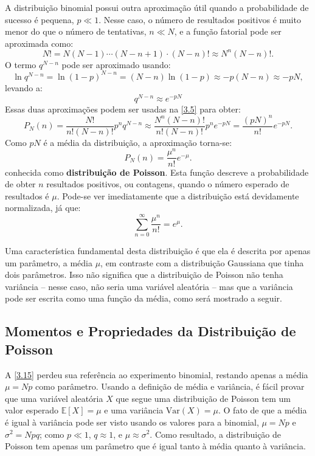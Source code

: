 A distribuição binomial possui outra aproximação útil quando a probabilidade de sucesso é pequena, $p \ll 1$. Nesse caso, o número de resultados positivos é muito menor do que o número de tentativas, $n \ll N$, e a função fatorial pode ser aproximada como:
\begin{equation*}
N! = N (N - 1) \cdots (N - n + 1) \cdot (N - n)! \approx N^n(N - n)!. 
\end{equation*}
O termo $q^{N - n}$ pode ser aproximado usando:
\begin{equation*}
\ln q^{N - n} = \ln(1 - p)^{N - n} = (N - n) \ln(1 - p) \approx - p(N - n) \approx - pN, 
\end{equation*}
levando a:
\begin{equation*}
q^{N - n} \approx e^{- pN}
\end{equation*}
Essas duas aproximações podem ser usadas na \autoref{3.5} para obter:
\begin{equation}
P_N(n) = \dfrac{N!}{n!(N-n)!} p^n q^{N-n} \approx \dfrac{N^n(N - n)!}{n!(N - n)!}p^n e^{- pN} = \dfrac{(pN)^n}{n!}e^{- pN}.
\end{equation}
Como $pN$ é a média da distribuição, a aproximação torna-se:
\begin{equation}\label{3.15}
P_N(n) = \dfrac{\mu^n}{n!}e^{- \mu}.
\end{equation}
conhecida como \textbf{distribuição de Poisson}. Esta função descreve a probabilidade de obter $n$ resultados positivos, ou contagens, quando o número esperado de resultados é $\mu$. Pode-se ver imediatamente que a distribuição está devidamente normalizada, já que:
\begin{equation}\label{3.17}
\sum_{n=0}^{\infty} \dfrac{\mu^n}{n!} = e^\mu. 
\end{equation}

Uma característica fundamental desta distribuição é que ela é descrita por apenas um parâmetro, a média $\mu$, em contraste com a distribuição Gaussiana que tinha dois parâmetros. Isso não significa que a distribuição de Poisson não tenha variância -- nesse caso, não seria uma variável aleatória -- mas que a variância pode ser escrita como uma função da média, como será mostrado a seguir.

\subsection{Momentos e Propriedades da Distribuição de Poisson}

A \autoref{3.15} perdeu sua referência ao experimento binomial, restando apenas a média $\mu = Np$ como parâmetro. Usando a definição de média e variância, é fácil provar que uma variável aleatória $X$ que segue uma distribuição de Poisson tem um valor esperado $\mathbb{E}[X] = \mu$ e uma variância $\text{Var}(X) = \mu$. O fato de que a média é igual à variância pode ser visto usando os valores para a binomial, $\mu = Np$ e $\sigma^2 = Npq$; como $p \ll 1$, $q \approx 1$, e $\mu \approx \sigma^2$. Como resultado, a distribuição de Poisson tem apenas um parâmetro que é igual tanto à média quanto à variância.


